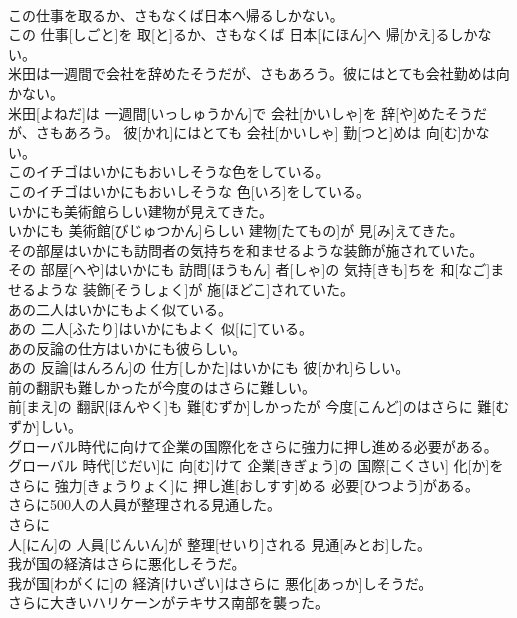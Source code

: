 \documentclass[8pt]{extreport}
\begin{document}
\begin{CJK}{UTF8}{min}
\\	この仕事を取るか、さもなくば日本へ帰るしかない。	
\\	この 仕事[しごと]を 取[と]るか、さもなくば 日本[にほん]へ 帰[かえ]るしかない。
\\	米田は一週間で会社を辞めたそうだが、さもあろう。彼にはとても会社勤めは向かない。	
\\	米田[よねだ]は 一週間[いっしゅうかん]で 会社[かいしゃ]を 辞[や]めたそうだが、さもあろう。 彼[かれ]にはとても 会社[かいしゃ] 勤[つと]めは 向[む]かない。
\\	このイチゴはいかにもおいしそうな色をしている。	
\\	このイチゴはいかにもおいしそうな 色[いろ]をしている。
\\	いかにも美術館らしい建物が見えてきた。	
\\	いかにも 美術館[びじゅつかん]らしい 建物[たてもの]が 見[み]えてきた。
\\	その部屋はいかにも訪問者の気持ちを和ませるような装飾が施されていた。	
\\	その 部屋[へや]はいかにも 訪問[ほうもん] 者[しゃ]の 気持[きも]ちを 和[なご]ませるような 装飾[そうしょく]が 施[ほどこ]されていた。
\\	あの二人はいかにもよく似ている。	
\\	あの 二人[ふたり]はいかにもよく 似[に]ている。
\\	あの反論の仕方はいかにも彼らしい。	
\\	あの 反論[はんろん]の 仕方[しかた]はいかにも 彼[かれ]らしい。
\\	前の翻訳も難しかったが今度のはさらに難しい。	
\\	前[まえ]の 翻訳[ほんやく]も 難[むずか]しかったが 今度[こんど]のはさらに 難[むずか]しい。
\\	グローバル時代に向けて企業の国際化をさらに強力に押し進める必要がある。	
\\	グローバル 時代[じだい]に 向[む]けて 企業[きぎょう]の 国際[こくさい] 化[か]をさらに 強力[きょうりょく]に 押し進[おしすす]める 必要[ひつよう]がある。
\\	さらに500人の人員が整理される見通した。	
\\	さらに 
\\	人[にん]の 人員[じんいん]が 整理[せいり]される 見通[みとお]した。
\\	我が国の経済はさらに悪化しそうだ。	
\\	我が国[わがくに]の 経済[けいざい]はさらに 悪化[あっか]しそうだ。
\\	さらに大きいハリケーンがテキサス南部を襲った。	

\end{CJK}
\end{document}

